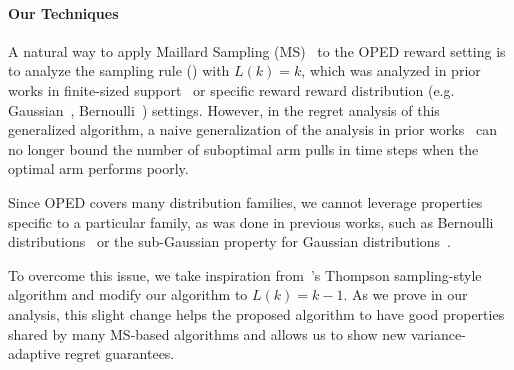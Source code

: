 \paragraph{Our Techniques}
A natural way to apply Maillard Sampling (MS)~\citep{maillard2011apprentissage} to the OPED reward setting is to analyze the sampling rule () with $L(k) = k$, which was analyzed in prior works in finite-sized support~\citep{honda10asymptotically} or specific reward reward distribution (e.g. Gaussian~\citep{bian2022maillard}, Bernoulli~\citep{qin2023kullback}) settings. However, in the regret analysis of this generalized algorithm, a naive generalization of the analysis in prior works~\citep{honda10asymptotically,bian2021maillard,qin2023kullback} can no longer bound the number of suboptimal arm pulls in time steps when the optimal arm performs poorly.

Since OPED covers many distribution families, we cannot leverage properties specific to a particular family, as was done in previous works, such as Bernoulli distributions~\citep{qin2023kullback} or the sub-Gaussian property for Gaussian distributions~\citep{bian2022maillard}.

To overcome this issue, we take inspiration from~\citet{jin2022finite}'s Thompson sampling-style algorithm and modify our algorithm to $L(k)=k-1$.
As we prove in our analysis, this slight change helps the proposed algorithm to have good properties shared by many MS-based algorithms and allows us to show new variance-adaptive regret guarantees.

